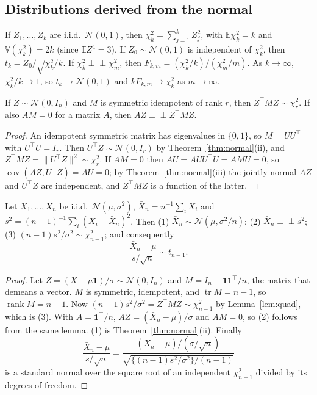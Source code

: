 \documentclass[11pt,a4paper]{article}
\newcommand{\E}{\mathbb{E}}
\newcommand{\V}{\mathbb{V}}
\newcommand{\N}{\mathcal{N}}
\newcommand{\Cov}{\operatorname{cov}}
\newcommand{\tr}{\operatorname{tr}}
\newcommand{\rank}{\operatorname{rank}}
\newcommand{\iid}{i.i.d.}
\newcommand{\indep}{\perp\!\!\!\perp}
\newcommand{\one}{\mathbf 1}
\newcommand{\Xbar}{\bar X_n}
\begin{document}
\subsection{Distributions derived from the normal}\label{sec:chi2}

If $Z_1,\ldots,Z_k$ are \iid\ $\N(0,1)$, then $\chi^2_k=\sum_{j=1}^kZ_j^2$, with $\E\chi^2_k=k$ and $\V(\chi^2_k)=2k$ (since $\E Z^4=3$). If $Z_0\sim\N(0,1)$ is independent of $\chi^2_k$, then $t_k=Z_0/\sqrt{\chi^2_k/k}$. If $\chi^2_k\indep\chi^2_m$, then $F_{k,m}=(\chi^2_k/k)/(\chi^2_m/m)$. As $k\to\infty$, $\chi^2_k/k\to1$, so $t_k\to\N(0,1)$ and $kF_{k,m}\to\chi^2_k$ as $m\to\infty$.

\begin{lemma}\label{lem:quad}
If $Z\sim\N(0,I_n)$ and $M$ is symmetric idempotent of rank $r$, then $Z^\top MZ\sim\chi^2_r$. If also $AM=0$ for a matrix $A$, then $AZ\indep Z^\top MZ$.
\end{lemma}

\begin{proof}
An idempotent symmetric matrix has eigenvalues in $\{0,1\}$, so $M=UU^\top$ with $U^\top U=I_r$. Then $U^\top Z\sim\N(0,I_r)$ by Theorem~\ref{thm:normal}(ii), and $Z^\top MZ=\|U^\top Z\|^2\sim\chi^2_r$. If $AM=0$ then $AU=AUU^\top U=AMU=0$, so $\Cov(AZ,U^\top Z)=AU=0$; by Theorem~\ref{thm:normal}(iii) the jointly normal $AZ$ and $U^\top Z$ are independent, and $Z^\top MZ$ is a function of the latter.
\end{proof}

\begin{theorem}\label{thm:gausssample}
Let $X_1,\ldots,X_n$ be \iid\ $\N(\mu,\sigma^2)$, $\Xbar=n^{-1}\sum_iX_i$ and $s^2=(n-1)^{-1}\sum_i(X_i-\Xbar)^2$. Then \textup{(1)} $\Xbar\sim\N(\mu,\sigma^2/n)$; \textup{(2)} $\Xbar\indep s^2$; \textup{(3)} $(n-1)s^2/\sigma^2\sim\chi^2_{n-1}$; and consequently
\[
\frac{\Xbar-\mu}{s/\sqrt n}\sim t_{n-1}.
\]
\end{theorem}

\begin{proof}
Let $Z=(X-\mu\one)/\sigma\sim\N(0,I_n)$ and $M=I_n-\one\one^\top/n$, the matrix that demeans a vector. $M$ is symmetric, idempotent, and $\tr M=n-1$, so $\rank M=n-1$. Now $(n-1)s^2/\sigma^2=Z^\top MZ\sim\chi^2_{n-1}$ by Lemma~\ref{lem:quad}, which is (3). With $A=\one^\top/n$, $AZ=(\Xbar-\mu)/\sigma$ and $AM=0$, so (2) follows from the same lemma. (1) is Theorem~\ref{thm:normal}(ii). Finally
\[
\frac{\Xbar-\mu}{s/\sqrt n}=\frac{(\Xbar-\mu)/(\sigma/\sqrt n)}{\sqrt{\{(n-1)s^2/\sigma^2\}/(n-1)}}
\]
is a standard normal over the square root of an independent $\chi^2_{n-1}$ divided by its degrees of freedom.
\end{proof}
\end{document}
